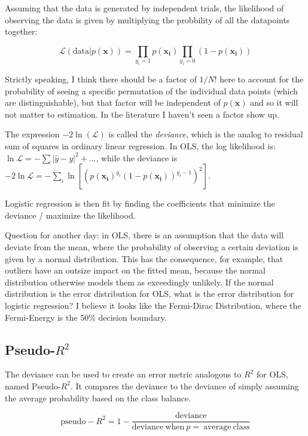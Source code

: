 Assuming that the data is generated by independent trials, the likelihood of observing the data is given by multiplying the probbility of all the datapoints together:

\begin{equation}
\mathscr{L}(\mathrm{data}|p(\mathbf{x})) = \prod_{y_i=1} p(\mathbf{x_i}) \prod_{y_i=0} (1-p(\mathbf{x_i}))
\end{equation}

Strictly speaking, I think there should be a factor of $1/N!$ here to account for the probability of seeing a specific permutation of the individual data points (which are distinguishable), but that factor will be independent of $p(\mathbf{x})$ and so it will not matter to estimation. In the literature I haven't seen a factor show up.

The expression $-2 \ln(\mathscr{L})$ is called the \textit{deviance}, which is the analog to residual sum of squares in ordinary linear regression. In OLS, the log likelihood is: $\ln\mathscr{L} = -\sum|\hat{y}-y|^2 + ...$, while the deviance is $-2\ln\mathscr{L} = -\sum_i \ln\left[\left(p(\mathbf{x_i})^{y_i}(1-p(\mathbf{x_i}))^{y_i-1}\right)^2\right]$.

Logistic regression is then fit by finding the coefficients that minimize the deviance / maximize the likelihood.

Question for another day: in OLS, there is an assumption that the data will deviate from the mean, where the probability of observing a certain deviation is given by a normal distribution. This has the consequence, for example, that outliers have an outsize impact on the fitted mean, because the normal distribution otherwise models them as exceedingly unlikely. If the normal distribution is the error distribution for OLS, what is the error distribution for logistic regression? I believe it looks like the Fermi-Dirac Distribution, where the Fermi-Energy is the 50\% decision boundary. 

\subsection{Pseudo-$R^2$}
The deviance can be used to create an error metric analogous to $R^2$ for OLS, named Pseudo-$R^2$. It compares the deviance to the deviance of simply assuming the average probability based on the class balance.

\begin{equation}
\mathrm{pseudo}-R^2 = 1 - \frac{\mathrm{deviance}}{\mathrm{deviance\ when\ }p=\mathrm{\ average\ class}}
\end{equation}
